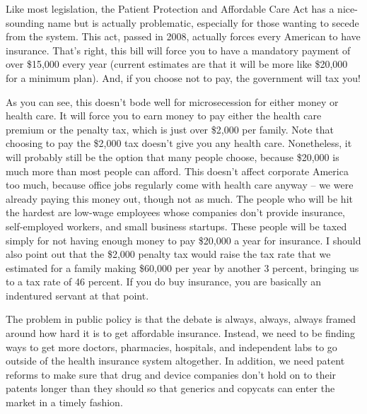 \begin{policynote}
Like most legislation, the Patient Protection and Affordable Care Act
has a nice-sounding name but is
actually problematic,
especially for those wanting to secede from the system. This act,
passed in 2008, actually forces every American to have insurance.
That's right, this bill will force you to have a
mandatory payment of over \$15,000 every year (current estimates are
that it will be more like \$20,000 for a minimum plan). And, if you
choose not to pay, the government will tax you!  

As you can see, this doesn't bode well for
microsecession for either money or health care. It will force you to
earn money to pay either the health care premium or the penalty tax,
which is just over \$2,000 per family. Note that choosing to pay the
\$2,000 tax doesn't give you any health care. 
Nonetheless, it will probably still be the option that many people
choose, because \$20,000 is much more than most people can afford. 
This doesn't affect corporate America too much,
because office jobs regularly come with health care anyway – we were
already paying this money out, though not as much.  The people who will
be hit the hardest are low-wage employees whose companies
don't provide insurance, self-employed workers, and
small business startups.  These people will be taxed simply for not
having enough money to pay \$20,000 a year for insurance.  I should
also point out that the \$2,000 penalty tax would raise the tax rate
that we estimated for a family making \$60,000 per year by another 3
percent, bringing us to a tax rate of 46 percent. If you do buy
insurance, you are basically an indentured servant at that point.

The problem in public policy is that the debate is always, always,
always framed around how hard it is to get affordable insurance.
Instead, we need to be finding ways to get more doctors, pharmacies,
hospitals, and independent labs
to go outside of the
health insurance system altogether. In addition, we need patent reforms
to make sure that drug and device companies don't hold
on to their patents longer than they should so that generics and
copycats can enter the market in a timely fashion.
\end{policynote}

